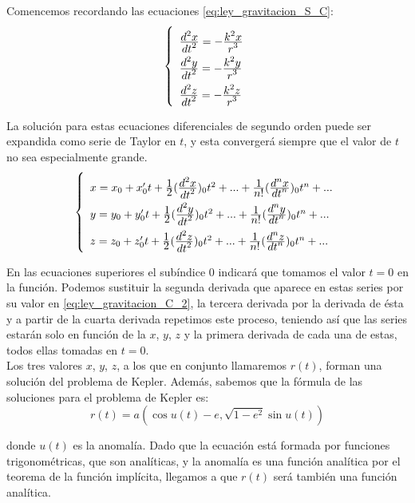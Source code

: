 \documentclass[11pt]{article}
\newcommand\ddfrac[2]{\frac{\displaystyle #1}{\displaystyle #2}}
\begin{document}
Comencemos recordando las ecuaciones \eqref{eq:ley_gravitacion_S_C}:
\begin{align}
\left\{
\def\arraystretch{2}
\begin{array}{l}
	\ddfrac{d^2x}{dt^2}=-\ddfrac{k^2x}{r^3}\\
	\ddfrac{d^2y}{dt^2}=-\ddfrac{k^2y}{r^3}\\
	\ddfrac{d^2z}{dt^2}=-\ddfrac{k^2z}{r^3}
\end{array}
\right.
\label{eq:ley_gravitacion_C_2}
\end{align}

La solución para estas ecuaciones diferenciales de segundo orden puede ser expandida como serie de Taylor en $t$, y esta convergerá siempre que el valor de $t$ no sea especialmente grande.
\begin{align}
\left\{
\def\arraystretch{2}
\begin{array}{l}
	x=x_0+x_0't+\ddfrac{1}{2}(\ddfrac{d^2x}{dt^2})_0t^2+...+\ddfrac{1}{n!}(\ddfrac{d^nx}{dt^n})_0t^n+...\\
	y=y_0+y_0't+\ddfrac{1}{2}(\ddfrac{d^2y}{dt^2})_0t^2+...+\ddfrac{1}{n!}(\ddfrac{d^ny}{dt^n})_0t^n+...\\
	z=z_0+z_0't+\ddfrac{1}{2}(\ddfrac{d^2z}{dt^2})_0t^2+...+\ddfrac{1}{n!}(\ddfrac{d^nz}{dt^n})_0t^n+...\\	
\end{array}
\right.
\label{eq:series_taylor}
\end{align}

En las ecuaciones superiores el subíndice 0 indicará que tomamos el valor $t=0$ en la función. Podemos sustituir la segunda derivada que aparece en estas series por su valor en \eqref{eq:ley_gravitacion_C_2}, la tercera derivada por la derivada de ésta y a partir de la cuarta derivada repetimos este proceso, teniendo así que las series estarán solo en función de la $x$, $y$, $z$ y la primera derivada de cada una de estas, todos ellas tomadas en $t=0$.\\

Los tres valores $x$, $y$, $z$, a los que en conjunto llamaremos $r(t)$, forman una solución del problema de Kepler. Además, sabemos que la fórmula de las soluciones para el problema de Kepler es:
\[
r(t)=a(\cos{u(t)}-e,\sqrt{1-e^2}\sin{u(t)})
\]

\noindent donde $u(t)$ es la anomalía. Dado que la ecuación está formada por funciones trigonométricas, que son analíticas, y la anomalía es una función analítica por el teorema de la función implícita, llegamos a que $r(t)$ será también una función analítica.\\
\end{document}
